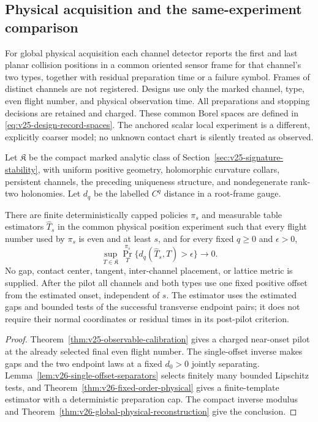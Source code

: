 \subsection{Physical acquisition and the same-experiment comparison}

For global physical acquisition each channel detector reports the first and
last planar collision positions in a common oriented sensor frame for that
channel's two types, together with residual preparation time or a failure
symbol.  Frames of distinct channels are not registered.  Designs use only
the marked channel, type, even flight number, and physical observation time.
All preparations and stopping decisions are retained and charged.  These
common Borel spaces are defined in \eqref{eq:v25-design-record-spaces}.
The anchored scalar local experiment is a different, explicitly coarser
model; no unknown contact chart is silently treated as observed.

Let \(\mathfrak K\) be the compact marked analytic class of
Section~\ref{sec:v25-signature-stability}, with uniform positive geometry,
holomorphic curvature collars, persistent channels, the preceding uniqueness
structure, and nondegenerate rank-two holonomies.  Let \(d_q\) be the
labelled \(C^q\) distance in a root-frame gauge.

\begin{theorem}
\label{thm:v26-intro-physical}
\label{thm:v25-intro-physical}
There are finite deterministically capped policies \(\pi_s\) and measurable
table estimators \(\widehat T_s\) in the common physical position experiment
such that every flight number used by \(\pi_s\) is even and at least
\(s\), and for every fixed \(q\ge0\) and \(\epsilon>0\),
\[
 \sup_{T\in\mathfrak K}\Pr_T^{\pi_s}
       \{d_q(\widehat T_s,T)>\epsilon\}\longrightarrow0.
\]
No gap, contact center, tangent, inter-channel placement, or lattice metric
is supplied.  After the pilot all channels and both types use one fixed
positive offset from the estimated onset, independent of \(s\).  The
estimator uses the estimated gaps and bounded tests of the successful
transverse endpoint pairs; it does not require their normal coordinates
or residual times in its post-pilot criterion.
\end{theorem}

\begin{proof}
Theorem~\ref{thm:v25-observable-calibration} gives a charged near-onset
pilot at the already selected final even flight number.  The
single-offset inverse makes gaps and the two endpoint laws at a fixed
\(d_0>0\) jointly separating.  Lemma~\ref{lem:v26-single-offset-separators}
selects finitely many bounded Lipschitz tests, and
Theorem~\ref{thm:v26-fixed-order-physical} gives a finite-template estimator
with a deterministic preparation cap.  The compact inverse modulus and
Theorem~\ref{thm:v26-global-physical-reconstruction} give the conclusion.
\end{proof}


